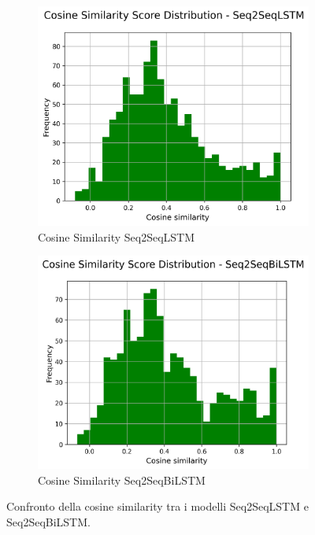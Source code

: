 \documentclass[a4paper, 12pt]{article}
\begin{document}
\begin{figure}[H]
    \centering
    \begin{subfigure}{0.45\textwidth}
        \centering
        \includegraphics[width=\textwidth]{media/Seq2SeqLSTM_cosine_similarity_scores.png}
        \caption{Cosine Similarity Seq2SeqLSTM}
    \end{subfigure}
    \hfill
    \begin{subfigure}{0.45\textwidth}
        \centering
        \includegraphics[width=\textwidth]{media/Seq2SeqBiLSTM_cosine_similarity_scores.png}
        \caption{Cosine Similarity Seq2SeqBiLSTM}
    \end{subfigure}
    \caption{Confronto della cosine similarity tra i modelli Seq2SeqLSTM e Seq2SeqBiLSTM.}
    \label{fig:cosine_similarity_comparison}
\end{figure}
\end{document}
